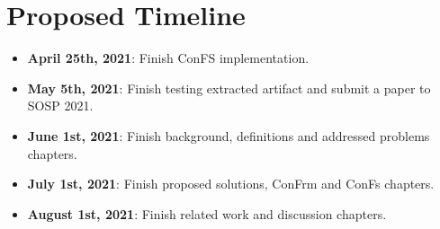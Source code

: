 \section{Proposed Timeline}
\begin{itemize}
	\item \textbf{April 25th, 2021}: Finish ConFS implementation.
	\item \textbf{May 5th, 2021}: Finish testing extracted artifact and submit a paper to SOSP 2021.
	\item \textbf{June 1st, 2021}: Finish background, definitions and addressed problems chapters.
	\item \textbf{July 1st, 2021}: Finish proposed solutions, ConFrm and ConFs chapters.
	\item \textbf{August 1st, 2021}: Finish related work and discussion chapters.
\end{itemize}
